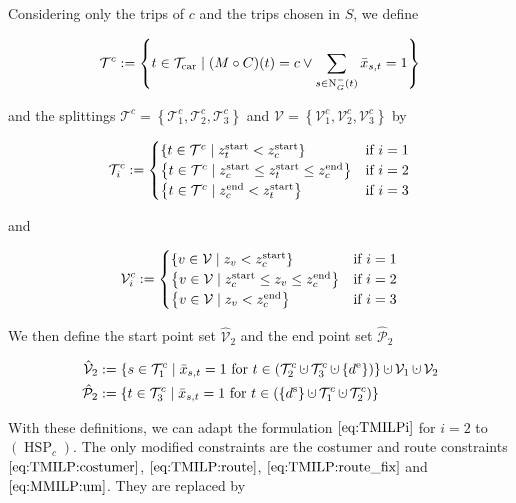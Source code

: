 Considering only the trips of $c$ and the trips chosen in $S$, we define

\begin{align*}
	\mathcal{T}^c := \left\{t\in\mathcal{T}_{\operatorname{car}}\mid(M\circ C)(t)=c\lor \sum_{s\in\operatorname{N}_G^-(t)} \bar{x}_{s,t}=1\right\}
\end{align*}

and the splittings $\mathcal{T}^c=\left\{\mathcal{T}^c_1,\mathcal{T}^c_2,\mathcal{T}^c_3\right\}$ and $\mathcal{V}=\left\{\mathcal{V}^c_1,\mathcal{V}^c_2,\mathcal{V}^c_3\right\}$ by

\begin{align*}
	\mathcal{T}^c_i := \begin{cases}
		\left\{t\in\mathcal{T}^c\mid z^{\operatorname{start}}_t<z^{\operatorname{start}}_c\right\} & \text{if } i=1 \\
		\left\{t\in\mathcal{T}^c\mid z^{\operatorname{start}}_c\leq z^{\operatorname{start}}_t\leq z^{\operatorname{end}}_c\right\} & \text{if } i=2 \\
		\left\{t\in\mathcal{T}^c\mid z^{\operatorname{end}}_c<z^{\operatorname{start}}_t\right\} & \text{if } i=3
	\end{cases}
\end{align*}

and

\begin{align*}
	\mathcal{V}^c_i := \begin{cases}
		\left\{v\in\mathcal{V}\mid z_v<z^{\operatorname{start}}_c\right\} & \text{if } i=1 \\
		\left\{v\in\mathcal{V}\mid z^{\operatorname{start}}_c\leq z_v\leq z^{\operatorname{end}}_c\right\} & \text{if } i=2 \\
		\left\{v\in\mathcal{V}\mid z_v<z^{\operatorname{end}}_c\right\} & \text{if } i=3
	\end{cases}
\end{align*}

We then define the start point set $\hat{\mathcal{V}}_2$ and the end point set $\hat{\mathcal{P}}_2$

\begin{align*}
	\hat{\mathcal{V}}_2 & := \left\{s\in\mathcal{T}^c_1\mid \bar{x}_{s,t}=1\text{ for }t\in\left(\mathcal{T}^c_2\cupdot\mathcal{T}^c_3\cupdot\left\{\de\right\}\right)\right\}\cupdot\mathcal{V}_1\cupdot\mathcal{V}_2 \\
	\hat{\mathcal{P}}_2 & := \left\{t\in\mathcal{T}^c_3\mid \bar{x}_{s,t}=1\text{ for }t\in\left(\left\{\ds\right\}\cupdot\mathcal{T}^c_1\cupdot\mathcal{T}^c_2\right)\right\}
\end{align*}

With these definitions, we can adapt the formulation $\eqref{eq:TMILPi}$ for $i=2$ to $(\operatorname{HSP}_c)$. The only modified constraints are the costumer and route constraints $\eqref{eq:TMILP:costumer}$, $\eqref{eq:TMILP:route}$, $\eqref{eq:TMILP:route_fix}$ and $\eqref{eq:MMILP:um}$. They are replaced by

